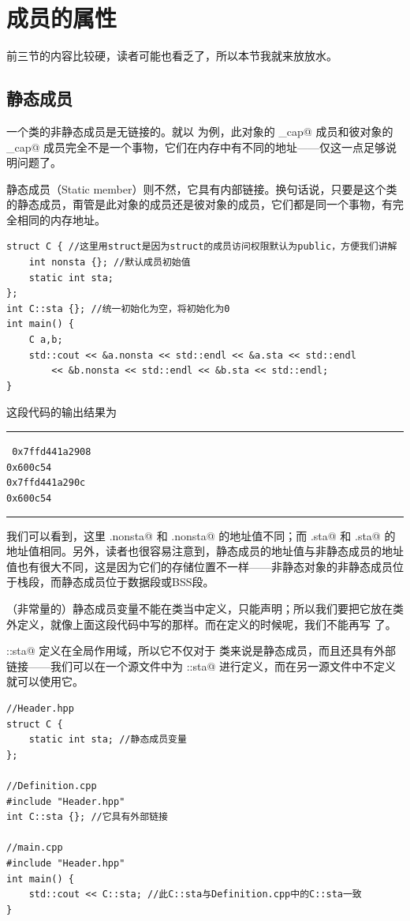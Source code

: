 \section{成员的属性}
前三节的内容比较硬，读者可能也看乏了，所以本节我就来放放水。\par
\subsection*{静态成员}
一个类的非静态成员是无链接的。就以 \lstinline@valarri@ 为例，此对象的 \lstinline@_cap@ 成员和彼对象的 \lstinline@_cap@ 成员完全不是一个事物，它们在内存中有不同的地址——仅这一点足够说明问题了。\par
静态成员（Static member）则不然，它具有内部链接。换句话说，只要是这个类的静态成员，甭管是此对象的成员还是彼对象的成员，它们都是同一个事物，有完全相同的内存地址。
\begin{lstlisting}
struct C { //这里用struct是因为struct的成员访问权限默认为public，方便我们讲解
    int nonsta {}; //默认成员初始值
    static int sta;
};
int C::sta {}; //统一初始化为空，将初始化为0
int main() {
    C a,b;
    std::cout << &a.nonsta << std::endl << &a.sta << std::endl
        << &b.nonsta << std::endl << &b.sta << std::endl;
}
\end{lstlisting}
这段代码的输出结果为\\\noindent\rule{\linewidth}{.2pt}\texttt{
0x7ffd441a2908\\
0x600c54\\
0x7ffd441a290c\\
0x600c54
}\\\noindent\rule{\linewidth}{.2pt}
我们可以看到，这里 \lstinline@a.nonsta@ 和 \lstinline@b.nonsta@ 的地址值不同；而 \lstinline@a.sta@ 和 \lstinline@b.sta@ 的地址值相同。另外，读者也很容易注意到，静态成员的地址值与非静态成员的地址值也有很大不同，这是因为它们的存储位置不一样——非静态对象的非静态成员位于栈段，而静态成员位于数据段或BSS段。\par
（非常量的）静态成员变量不能在类当中定义，只能声明；所以我们要把它放在类外定义，就像上面这段代码中写的那样。而在定义的时候呢，我们不能再写 \lstinline@static@ 了。\par
\lstinline@C::sta@ 定义在全局作用域，所以它不仅对于 \lstinline@C@ 类来说是静态成员，而且还具有外部链接——我们可以在一个源文件中为 \lstinline@C::sta@ 进行定义，而在另一源文件中不定义就可以使用它。
\begin{lstlisting}
//Header.hpp
struct C {
    static int sta; //静态成员变量
};

//Definition.cpp
#include "Header.hpp"
int C::sta {}; //它具有外部链接

//main.cpp
#include "Header.hpp"
int main() {
    std::cout << C::sta; //此C::sta与Definition.cpp中的C::sta一致
}
\end{lstlisting}\par
